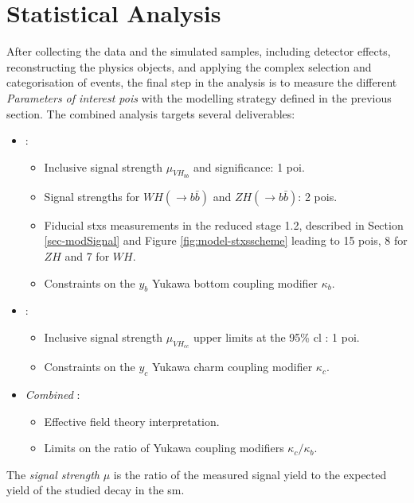 \section{Statistical Analysis}\label{sec-fitFramework}
After collecting the data and the simulated samples, including detector effects, reconstructing the physics objects, and applying the complex selection and categorisation of events, the final step in the analysis is to measure the different \textit{Parameters of interest \glspl{poi}} with the modelling strategy defined in the previous section. The combined analysis targets several deliverables:
\begin{itemize}[leftmargin=*]
\item \textit{\vhb}: 
    \begin{itemize}
        \item Inclusive signal strength $\mu_{VH_{bb}}$ and significance: 1 \gls{poi}.
        \item Signal strengths for $WH(\rightarrow b\bar{b})$ and $ZH(\rightarrow b\bar{b})$: 2 \glspl{poi}.
        \item Fiducial \gls{stxs} measurements in the reduced stage 1.2, described in Section \ref{sec-modSignal} and Figure \ref{fig:model-stxsscheme} leading to 15 \glspl{poi}, 8 for $ZH$ and 7 for $WH$.
        \item Constraints on the $y_b$ Yukawa bottom coupling modifier $\kappa_b$. 
    \end{itemize}
\item \textit{\vhc}:
    \begin{itemize}
        \item Inclusive signal strength $\mu_{VH_{cc}}$ upper limits at the 95\% \gls{cl} : 1 \gls{poi}.
        \item Constraints on the $y_c$ Yukawa charm coupling modifier $\kappa_c$. 
    \end{itemize}
\item \textit{Combined \vhbc}: 
    \begin{itemize}
        \item Effective field theory interpretation.
        \item Limits on the ratio of Yukawa coupling modifiers $\kappa_c / \kappa_b$.
    \end{itemize}
\end{itemize}

The \textit{signal strength} $\mu$ is the ratio of the measured signal yield to the expected yield of the studied decay in the \gls{sm}.

